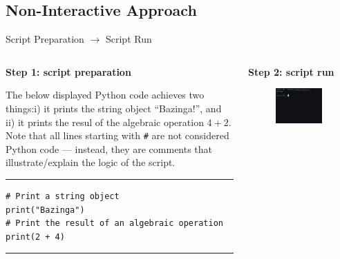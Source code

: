 \documentclass[aspectratio=1610]{beamer}
\begin{document}
\subsection{Non-Interactive Approach}

\begin{frame}[fragile]{Script Preparation $\rightarrow$ Script Run}
	\begin{columns}[t]
		\begin{column}{0.45\textwidth}		
		\textbf{Step 1: script preparation}	
		
		\vspace{1em}
		
		The below displayed Python code achieves two things:i) it prints the string object ``Bazinga!'', and ii) it prints the resul of the algebraic operation $4 + 2$. Note that all lines starting with \texttt{\#} are not considered Python code --- instead, they are comments that illustrate/explain the logic of the script.
		
		\rule{\textwidth}{1pt}
		\scriptsize
		\begin{verbatim}
# Print a string object
print("Bazinga")
# Print the result of an algebraic operation
print(2 + 4)
	    \end{verbatim}
		\rule{\textwidth}{1pt}
		
		\end{column}
		\begin{column}{0.45\textwidth}
		\textbf{Step 2: script run}	
		
		\vspace{1em}
		
	\begin{figure}
		\includegraphics[width=0.92\textwidth]{images/simple_script}
	\end{figure}
		\end{column}
	\end{columns}
\end{frame}
\end{document}
